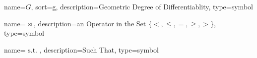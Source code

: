 	{%
		name=\ensuremath{G},
		sort=g,
		description=Geometric Degree of Differentiablity,
		type=symbol
	}
	\newcommand{\contdeggeombare}{\ensuremath{\gls{sym:contdeggeombare}}}
	\newcommand{\contdeggeom}[1]{\ensuremath{\contdeggeombare^{#1}}}


	{%
		name=\ensuremath{\bowtie},
		description=an Operator in the Set \ensuremath{\{<, \leq, =, \geq, >\}},
		type=symbol
	}
	\newcommand{\relop}{\gls{sym:relop}}

	{%
		name={\ensuremath{\text{ s.t. }}},
		description=Such That,
		type=symbol
	}
	\newcommand{\suchthat}{\gls{sym:suchthat}}
